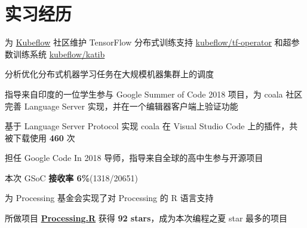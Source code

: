 \documentclass[]{deedy-resume-openfont}
\begin{document}
\begin{minipage}[t]{0.68\textwidth}


\section{实习经历}

\sectionsep
{}
\vspace{\topsep}
\begin{tightemize}
    \item 为 \href{https://github.com/kubeflow/kubeflow}{Kubeflow} 社区维护 TensorFlow 分布式训练支持 \href{https://github.com/kubeflow/tf-operator}{kubeflow/tf-operator} 和超参数训练系统 \href{https://github.com/kubeflow/katib}{kubeflow/katib}
    \item 分析优化分布式机器学习任务在大规模机器集群上的调度
\end{tightemize}
\sectionsep

\sectionsep
{}
\vspace{\topsep}
\begin{tightemize}
    \item 指导来自印度的一位学生参与 Google Summer of Code 2018 项目，为 coala 社区完善 Language Server 实现，并在一个编辑器客户端上验证功能
\end{tightemize}
\sectionsep

\sectionsep
{}
\vspace{\topsep}
\begin{tightemize}
    \item 基于 Language Server Protocol 实现 coala 在 Visual Studio Code 上的插件，共被下载使用 \textbf{460} 次
    \item 担任 Google Code In 2018 导师，指导来自全球的高中生参与开源项目
\end{tightemize}
\sectionsep

\sectionsep
{}
\vspace{\topsep}
\begin{tightemize}
    \item 本次 GSoC \textbf{接收率 6\%}(1318/20651)
    \item 为 Processing 基金会实现了对 Processing 的 R 语言支持
    \item 所做项目 \href{https://github.com/gaocegege/Processing.R}{\bf Processing.R} 获得 \textbf{92 stars}，成为本次编程之夏 star 最多的项目
\end{tightemize}
\sectionsep


\end{minipage}
\end{document}
